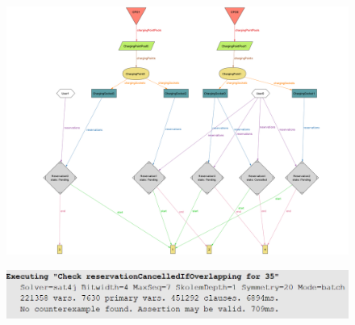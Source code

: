 
\begin{figure}[H]
    \centering
    \includegraphics[width=1\textwidth]{src/alloy/reservationModel.png}
\end{figure}
\begin{figure}[H]
    \centering
    \includegraphics[width=1\textwidth]{src/alloy/reservationModel_assertion.png}
\end{figure}
